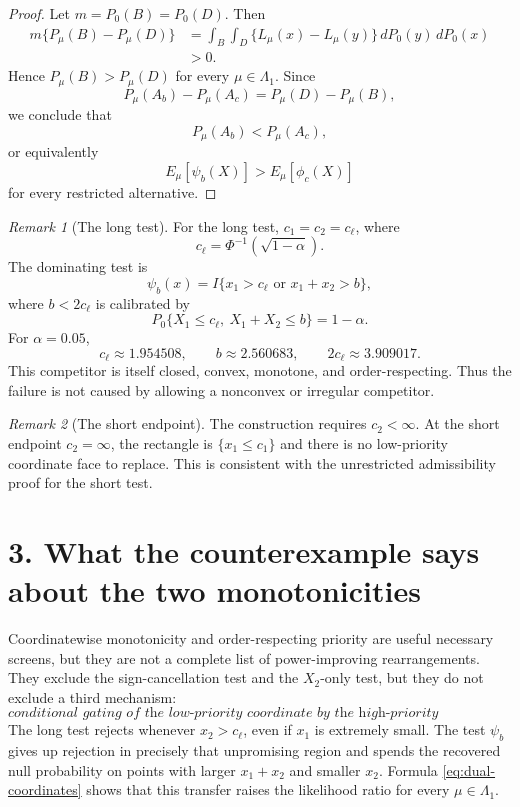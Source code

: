 \documentclass[12pt]{article}
\theoremstyle{definition}
\theoremstyle{remark}
\newtheorem{remark}{Remark}
\begin{document}
\begin{proof}
Let $m=P_0(B)=P_0(D)$.  Then
\begin{align*}
 m\{P_\mu(B)-P_\mu(D)\}
 &=
 \int_B\int_D\{L_\mu(x)-L_\mu(y)\}\,dP_0(y)\,dP_0(x)\\
 &>0.
\end{align*}
Hence $P_\mu(B)>P_\mu(D)$ for every $\mu\in\Lambda_1$.  Since
\[
P_\mu(A_b)-P_\mu(A_c)=P_\mu(D)-P_\mu(B),
\]
we conclude that
\[
P_\mu(A_b)<P_\mu(A_c),
\]
or equivalently
\[
E_\mu[\psi_b(X)]>E_\mu[\phi_c(X)]
\]
for every restricted alternative.
\end{proof}

\begin{remark}[The long test]
For the long test, $c_1=c_2=c_\ell$, where
\[
c_\ell=\Phi^{-1}(\sqrt{1-\alpha}).
\]
The dominating test is
\[
\psi_b(x)=I\{x_1>c_\ell\text{ or }x_1+x_2>b\},
\]
where $b<2c_\ell$ is calibrated by
\[
P_0\{X_1\le c_\ell,\ X_1+X_2\le b\}=1-\alpha.
\]
For $\alpha=0.05$,
\[
c_\ell\approx1.954508,
\qquad
b\approx2.560683,
\qquad
2c_\ell\approx3.909017.
\]
This competitor is itself closed, convex, monotone, and order-respecting.  Thus the failure is not caused by allowing a nonconvex or irregular competitor.
\end{remark}

\begin{remark}[The short endpoint]
The construction requires $c_2<\infty$.  At the short endpoint $c_2=\infty$, the rectangle is $\{x_1\le c_1\}$ and there is no low-priority coordinate face to replace.  This is consistent with the unrestricted admissibility proof for the short test.
\end{remark}

\section*{3. What the counterexample says about the two monotonicities}

Coordinatewise monotonicity and order-respecting priority are useful necessary screens, but they are not a complete list of power-improving rearrangements.  They exclude the sign-cancellation test and the $X_2$-only test, but they do not exclude a third mechanism:
\[
\textit{conditional gating of the low-priority coordinate by the high-priority coordinate.}
\]
The long test rejects whenever $x_2>c_\ell$, even if $x_1$ is extremely small.  The test $\psi_b$ gives up rejection in precisely that unpromising region and spends the recovered null probability on points with larger $x_1+x_2$ and smaller $x_2$.  Formula \eqref{eq:dual-coordinates} shows that this transfer raises the likelihood ratio for every $\mu\in\Lambda_1$.
\end{document}
